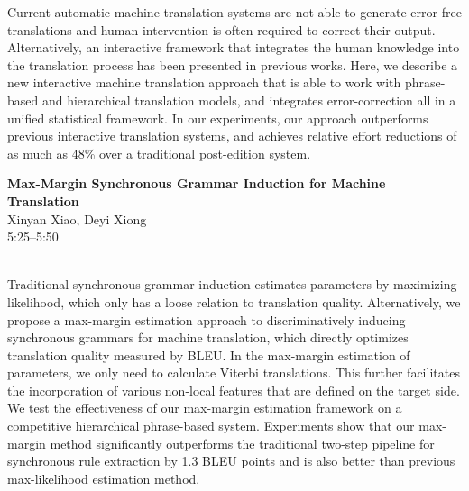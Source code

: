 \documentclass[twoside,makeidx]{book}
\begin{document}
\nopagebreak%
\noindent%
{\small Current automatic machine translation systems are not able to generate error-free translations and human intervention is often required to correct their output. Alternatively, an interactive framework that integrates the human knowledge into the translation process has been presented in previous works. Here, we describe a new interactive machine translation approach that is able to work with phrase-based and hierarchical translation models, and integrates error-correction all in a unified statistical framework. In our experiments, our approach outperforms previous interactive translation systems, and achieves relative effort reductions of as much as 48\% over a traditional post-edition system.}
\par\vspace{2em}\noindent%
\begin{minipage}{\linewidth}%
\begin{center}
\textbf{\normalsize Max-Margin Synchronous Grammar Induction for Machine Translation}\\
\normalsize  Xinyan Xiao,  Deyi Xiong\\
{\small 5:25--5:50}\\
\end{center}
\end{minipage}\\[0.5em]
\nopagebreak%
\noindent%
{\small Traditional synchronous grammar induction estimates parameters by maximizing likelihood, which only has a loose relation to translation quality. Alternatively, we propose a max-margin estimation approach to discriminatively inducing synchronous grammars for machine translation, which directly optimizes translation quality measured by BLEU. In the max-margin estimation of parameters, we only need to calculate Viterbi translations. This further facilitates the incorporation of various non-local features that are defined on the target side. We test the effectiveness of our max-margin estimation framework on a competitive hierarchical phrase-based system. Experiments show that our max-margin method significantly outperforms the traditional two-step pipeline for synchronous rule extraction by 1.3 BLEU points and is also better than previous max-likelihood estimation method.}
\clearpage
\end{document}
